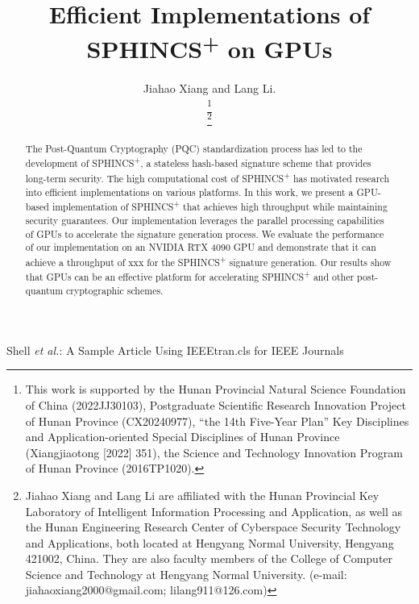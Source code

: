 \documentclass[journal]{IEEEtran}
\begin{document}
\title{Efficient Implementations of SPHINCS\textsuperscript{+} on GPUs}

\author{Jiahao Xiang and Lang Li.

  \thanks{This work is supported by the Hunan Provincial Natural Science Foundation of China (2022JJ30103), Postgraduate Scientific Research Innovation Project of Hunan Province (CX20240977), “the 14th Five-Year Plan” Key Disciplines and Application-oriented Special Disciplines of Hunan Province (Xiangjiaotong [2022] 351), the Science and Technology Innovation Program of Hunan Province (2016TP1020).}

  \thanks{Jiahao Xiang and Lang Li are affiliated with the Hunan Provincial Key Laboratory of Intelligent Information Processing and Application, as well as the Hunan Engineering Research Center of Cyberspace Security Technology and Applications, both located at Hengyang Normal University, Hengyang 421002, China. They are also faculty members of the College of Computer Science and Technology at Hengyang Normal University. (e-mail: jiahaoxiang2000@gmail.com; lilang911@126.com)}%
}

%
{Shell \MakeLowercase{\textit{et al.}}: A Sample Article Using IEEEtran.cls for IEEE Journals}

\IEEEpubid{}

\maketitle

\begin{abstract}

  The Post-Quantum Cryptography (PQC) standardization process has led to the development of SPHINCS\textsuperscript{+}, a stateless hash-based signature scheme that provides long-term security. The high computational cost of SPHINCS\textsuperscript{+} has motivated research into efficient implementations on various platforms. In this work, we present a GPU-based implementation of SPHINCS\textsuperscript{+} that achieves high throughput while maintaining security guarantees. Our implementation leverages the parallel processing capabilities of GPUs to accelerate the signature generation process. We evaluate the performance of our implementation on an NVIDIA RTX 4090 GPU and demonstrate that it can achieve a throughput of xxx for the SPHINCS\textsuperscript{+} signature generation. Our results show that GPUs can be an effective platform for accelerating SPHINCS\textsuperscript{+} and other post-quantum cryptographic schemes.

\end{abstract}
\end{document}
